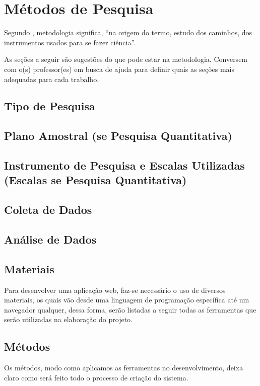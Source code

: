 \documentclass[
	article,			%
	12pt,				%
	oneside,			%
	a4paper,			%
    BIBLATEX,           %
	english,			%
	brazil,				%
	sumario=tradicional
	]{abntex2}
\begin{document}
\section{Métodos de Pesquisa}

Segundo , metodologia significa, “na origem do termo, estudo dos caminhos, dos instrumentos usados para se fazer ciência”.

As seções a seguir são sugestões do que pode estar na metodologia. Conversem com o(s) professor(es) em busca de ajuda para definir quais as seções mais adequadas para cada trabalho.

\subsection{Tipo de Pesquisa}

\subsection{Plano Amostral (se Pesquisa Quantitativa)}

\subsection{Instrumento de Pesquisa e Escalas Utilizadas (Escalas se Pesquisa Quantitativa)}

\subsection{Coleta de Dados}

\subsection{Análise de Dados}

\subsection{Materiais}
Para desenvolver uma aplicação web, faz-se necessário o uso de diversos materiais, os quais vão desde uma linguagem de programação específica até um navegador qualquer, dessa forma, serão listadas a seguir todas as ferramentas que serão utilizadas na elaboração do projeto.
	
 \subsection{Métodos}
Os métodos, modo como aplicamos as ferramentas no desenvolvimento, deixa claro como será feito todo o processo de criação do sistema.
\end{document}
